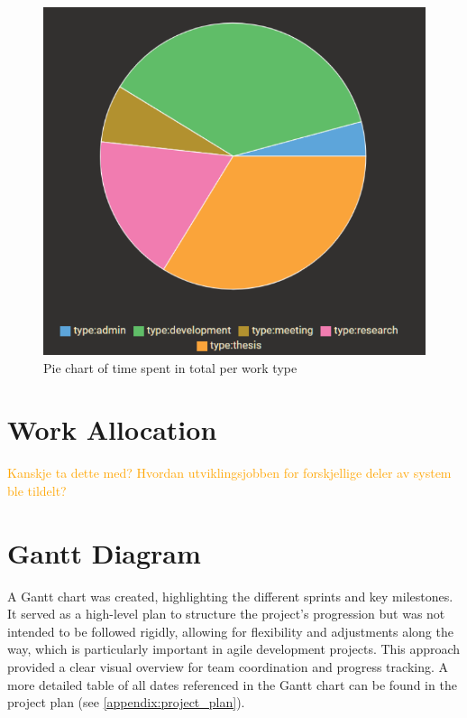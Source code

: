 \begin{figure}[h]
    \centering
    \includegraphics[width=0.5\linewidth]{figures/time_tracking_by_type.pdf}
    \caption{Pie chart of time spent in total per work type}
    \label{fig:time_tracking_by_type}
\end{figure}


\section{Work Allocation}

\textcolor{orange}{Kanskje ta dette med? Hvordan utviklingsjobben for forskjellige deler av system ble tildelt?}

\section{Gantt Diagram}

A Gantt chart was created, highlighting the different sprints and key milestones. It served as a high-level plan to structure the project's progression but was not intended to be followed rigidly, allowing for flexibility and adjustments along the way, which is particularly important in agile development projects. This approach provided a clear visual overview for team coordination and progress tracking. A more detailed table of all dates referenced in the Gantt chart can be found in the project plan (see \autoref{appendix:project_plan}).

